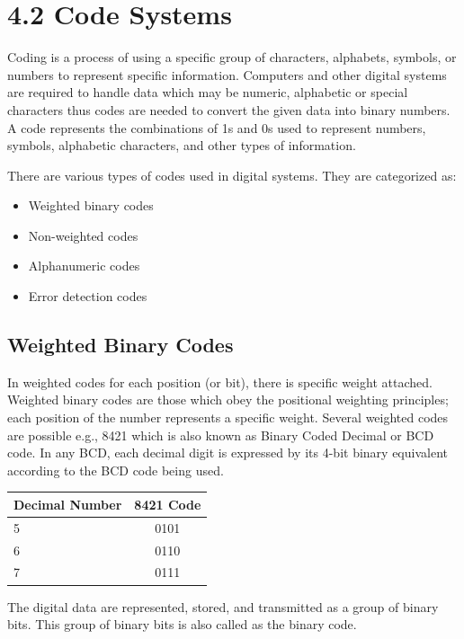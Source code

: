 \documentclass[12pt,a4paper]{article}
\begin{document}
\section*{4.2 Code Systems}
Coding is a process of using a specific group of characters, alphabets, symbols, or numbers to represent specific information. Computers and other digital systems are required to handle data which may be numeric, alphabetic or special characters thus codes are needed to convert the given data into binary numbers. A code represents the combinations of 1s and 0s used to represent numbers, symbols, alphabetic characters, and other types of information.

There are various types of codes used in digital systems. They are categorized as:
\begin{itemize}
    \item Weighted binary codes
    \item Non-weighted codes
    \item Alphanumeric codes
    \item Error detection codes
\end{itemize}

\subsection*{Weighted Binary Codes}
In weighted codes for each position (or bit), there is specific weight attached. Weighted binary codes are those which obey the positional weighting principles; each position of the number represents a specific weight. Several weighted codes are possible e.g., 8421 which is also known as Binary Coded Decimal or BCD code. In any BCD, each decimal digit is expressed by its 4-bit binary equivalent according to the BCD code being used.

\begin{table}[h!]
    \centering
    \begin{tabular}{|l|c|}
        \hline
        \textbf{Decimal Number} & \textbf{8421 Code} \\ \hline
        5 & 0101 \\ \hline
        6 & 0110 \\ \hline
        7 & 0111 \\ \hline
    \end{tabular}
\end{table}

The digital data are represented, stored, and transmitted as a group of binary bits. This group of binary bits is also called as the binary code.
\end{document}
